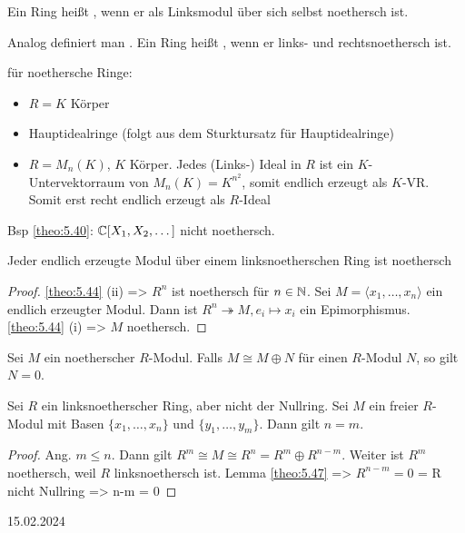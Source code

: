 \documentclass[../main.tex]{subfiles}
\begin{document}
\begin{definition}
    Ein Ring heißt , wenn er als Linksmodul über sich selbst noethersch ist.

    Analog definiert man .
    Ein Ring heißt , wenn er links- und rechtsnoethersch ist.
\end{definition}
\begin{example*}
    für noethersche Ringe:
    \begin{itemize}
        \item $R=K$ Körper
        \item Hauptidealringe (folgt aus dem Sturktursatz für Hauptidealringe)
        \item $R=M_n(K)$, $K$ Körper. Jedes (Links-) Ideal in $R$ ist ein $K$-Untervektorraum von $M_n(K) = K^{n^2}$, somit endlich erzeugt als $K$-VR. Somit erst recht endlich erzeugt als $R$-Ideal
    \end{itemize}
    Bsp \ref{theo:5.40}: $\mathbb{C}[X_1,X_2,\dots]$ nicht noethersch.
\end{example*}
\begin{lemma}\label{theo:5.46}
    Jeder endlich erzeugte Modul über einem linksnoetherschen Ring ist noethersch
\end{lemma}
\begin{proof}
    \ref{theo:5.44} (ii) => $R^n$ ist noethersch für $n\in \mathbb{N}$.
    Sei $M=\langle x_1, \dots, x_n\rangle$ ein endlich erzeugter Modul. Dann ist $R^n \twoheadrightarrow M, e_i\mapsto x_i$ ein Epimorphismus.
    \ref{theo:5.44} (i) => $M$ noethersch.
\end{proof}
\begin{lemma}\label{theo:5.47}
    Sei $M$ ein noetherscher $R$-Modul. Falls $M\cong M\oplus N$ für einen $R$-Modul $N$, so gilt $N=0$.
\end{lemma}
\begin{theorem}
    Sei $R$ ein linksnoetherscher Ring, aber nicht der Nullring.
    Sei $M$ ein freier $R$-Modul mit Basen $\{x_1,\dots,x_n\}$ und $\{y_1,\dots,y_m\}$. Dann gilt $n=m$.
\end{theorem}

\begin{proof}
    Ang. $m\leq n$. Dann gilt $R^m\cong M\cong R^n = R^m \oplus R^{n-m}$. Weiter ist $R^m$ noethersch, weil $R$ linksnoethersch ist.
    Lemma \ref{theo:5.47} => $R^{n-m} = 0$  = R nicht Nullring => n-m = 0 
\end{proof}

\begin{flushright}
    15.02.2024
\end{flushright}
\end{document}
